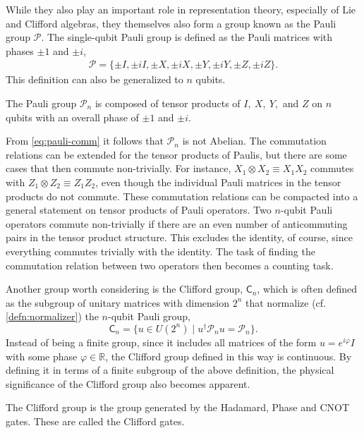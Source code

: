 While they also play
an important role in representation theory, especially of Lie and Clifford
algebras, they themselves also form a group known as the Pauli group
$\mathcal{P}$. The single-qubit Pauli group is defined as the Pauli matrices
with phases $\pm 1$ and $\pm i$,
\begin{align}
  \mathcal{P} = \{\pm I, \pm i I, \pm X, \pm i X, \pm Y, \pm i Y, \pm Z, \pm i
  Z \}
.\end{align}
This definition can also be generalized to $n$ qubits.
\begin{defn}\label{defn:pauligroup}
  The Pauli group $\mathcal{P}_n$ is composed of tensor products of $I,\ X,\
  Y,$ and $Z$ on $n$ qubits with an overall phase of $\pm 1$ and $\pm i$.
\end{defn}
From \cref{eq:pauli-comm} it follows that $\mathcal{P}_n$ is not Abelian.
The commutation relations can be extended for the tensor products of Paulis,
but there are some cases that then commute non-trivially. For instance,
$X_1\otimes X_2 \equiv X_1X_2$ commutes with $Z_1\otimes Z_2\equiv Z_1Z_2$, even though the individual
Pauli matrices in the tensor products do not commute. These commutation
relations can be compacted into a general statement on tensor products of Pauli
operators. Two $n$-qubit Pauli operators commute non-trivially if there are an
even number of anticommuting pairs in the tensor product structure. This
excludes the identity, of course, since everything commutes trivially with the
identity. The task of finding the commutation relation between two operators
then becomes a counting task.

Another group worth considering is the Clifford group, $\mathsf{C}_n$, which is
often defined as the subgroup of unitary matrices with dimension $2^n$ that
normalize (cf. \cref{defn:normalizer}) the $n$-qubit Pauli group,
$$\mathsf{C}_n = \{ u \in U\left(2^n\right) \mid u^\dagger \mathcal{P}_n u
= \mathcal{P}_n \}.$$
Instead of being a finite group, since it includes all matrices of the form
$u= e^{i\varphi} I$ with some phase $\varphi \in \mathbb{R}$, the Clifford
group defined in this way is continuous. By defining it in terms of a finite
subgroup of the above definition, the physical significance of the Clifford
group also becomes apparent.

\begin{defn}\label{defn:cliffords}
  The Clifford group is the group generated by the Hadamard, Phase and CNOT
  gates. These are called the Clifford gates. 
\end{defn}

